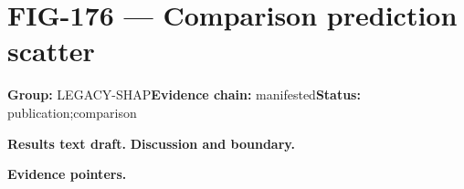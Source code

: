 \clearpage
\section{FIG-176 --- Comparison prediction scatter}
\label{figpage:fig-176}
\textbf{Group:} LEGACY-SHAP\quad \textbf{Evidence chain:} manifested\quad \textbf{Status:} publication;comparison

\textbf{Results text draft.} 
\textbf{Discussion and boundary.} 


\textbf{Evidence pointers.}



\vfill
